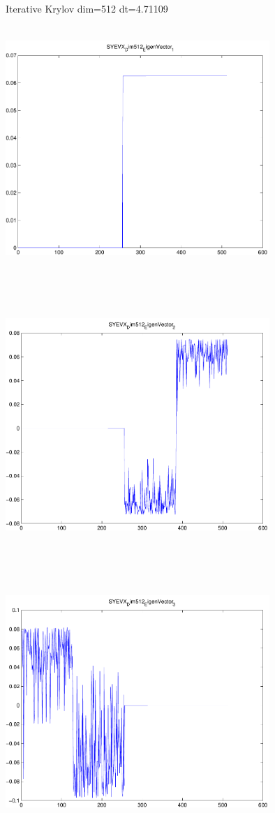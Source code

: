 \documentclass[9pt]{article}
\theoremstyle{plain}
\theoremstyle{definition}
\theoremstyle{remark}
\numberwithin{equation}{section}
\begin{document}
Iterative Krylov dim=512 dt=4.71109
\includegraphics[width=10.0cm,height=10.0cm]{SYEVX_Dim512_EigenVector_1.pdf}

\includegraphics[width=10.0cm,height=10.0cm]{SYEVX_Dim512_EigenVector_2.pdf}

\includegraphics[width=10.0cm,height=10.0cm]{SYEVX_Dim512_EigenVector_3.pdf}
\end{document}
